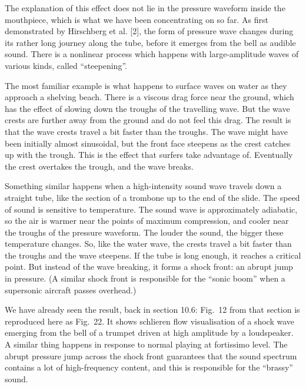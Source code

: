   The explanation of this effect does not lie in the pressure waveform inside 
  the mouthpiece, which is what we have been concentrating on so far. As first 
  demonstrated by Hirschberg et al. [2], the form of pressure wave changes 
  during its rather long journey along the tube, before it emerges from the 
  bell as audible sound. There is a nonlinear process which happens with 
  large-amplitude waves of various kinds, called “steepening”. 

  The most familiar example is what happens to surface waves on water as they 
  approach a shelving beach. There is a viscous drag force near the ground, 
  which has the effect of slowing down the troughs of the travelling wave. But 
  the wave crests are further away from the ground and do not feel this drag. 
  The result is that the wave crests travel a bit faster than the troughs. The 
  wave might have been initially almost sinusoidal, but the front face steepens 
  as the crest catches up with the trough. This is the effect that surfers take 
  advantage of. Eventually the crest overtakes the trough, and the wave breaks. 

  Something similar happens when a high-intensity sound wave travels down a 
  straight tube, like the section of a trombone up to the end of the slide. The 
  speed of sound is sensitive to temperature. The sound wave is approximately 
  adiabatic, so the air is warmer near the points of maximum compression, and 
  cooler near the troughs of the pressure waveform. The louder the sound, the 
  bigger these temperature changes. So, like the water wave, the crests travel 
  a bit faster than the troughs and the wave steepens. If the tube is long 
  enough, it reaches a critical point. But instead of the wave breaking, it 
  forms a shock front: an abrupt jump in pressure. (A similar shock front is 
  responsible for the “sonic boom” when a supersonic aircraft passes overhead.) 

  We have already seen the result, back in section 10.6: Fig.\ 12 from that 
  section is reproduced here as Fig.\ 22. It shows schlieren flow visualisation 
  of a shock wave emerging from the bell of a trumpet driven at high amplitude 
  by a loudspeaker. A similar thing happens in response to normal playing at 
  fortissimo level. The abrupt pressure jump across the shock front guarantees 
  that the sound spectrum contains a lot of high-frequency content, and this is 
  responsible for the “brassy” sound. 


